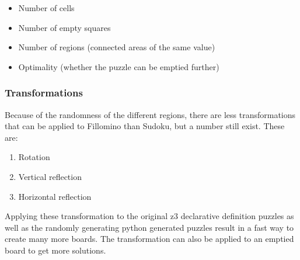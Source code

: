 \singlespace
\begin{itemize}
\item Number of cells
\item Number of empty squares
\item Number of regions (connected areas of the same value)
\item Optimality (whether the puzzle can be emptied further)
\end{itemize}

\doublespace
\subsubsection{Transformations}
Because of the randomness of the different regions, there are less
transformations that can be applied to Fillomino than Sudoku, but a
number still exist. These are:

\singlespace
\begin{enumerate}
\item Rotation
\item Vertical reflection
\item Horizontal reflection
\end{enumerate}
\doublespace

Applying these transformation to the original z3 declarative
definition puzzles as well as the randomly generating python generated
puzzles result in a fast way to create many more boards. The
transformation can also be applied to an emptied board to get more
solutions.

